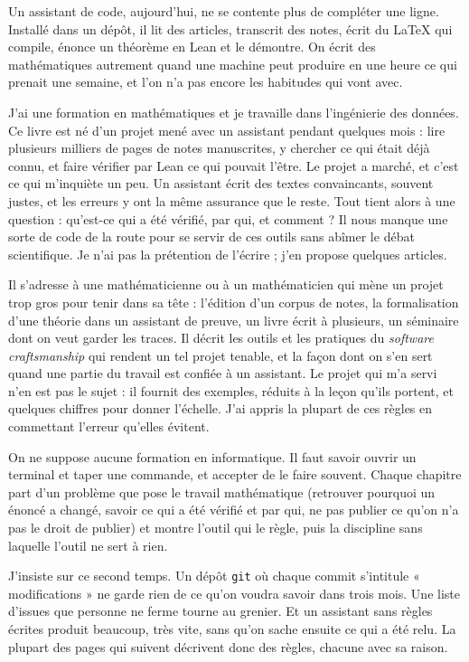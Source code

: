 Un assistant de code, aujourd'hui, ne se contente plus de compléter une ligne. Installé
dans un dépôt, il lit des articles, transcrit des notes, écrit du LaTeX qui compile, énonce
un théorème en Lean et le démontre. On écrit des mathématiques autrement quand une machine
peut produire en une heure ce qui prenait une semaine, et l'on n'a pas encore les habitudes
qui vont avec.

J'ai une formation en mathématiques et je travaille dans l'ingénierie des données.
Ce livre est né d'un projet mené avec un assistant pendant quelques mois : lire plusieurs milliers
de pages de notes manuscrites, y chercher ce qui était déjà connu, et faire vérifier par
Lean ce qui pouvait l'être. Le projet a marché, et c'est ce qui m'inquiète un peu. Un
assistant écrit des textes convaincants, souvent justes, et les erreurs y ont la même
assurance que le reste. Tout tient alors à une question : qu'est-ce qui a été vérifié, par
qui, et comment ? Il nous manque une sorte de code de la route pour se servir de ces outils
sans abîmer le débat scientifique. Je n'ai pas la prétention de l'écrire ; j'en propose
quelques articles.

Il s'adresse à une mathématicienne ou à un mathématicien qui mène un projet trop gros pour
tenir dans sa tête : l'édition d'un corpus de notes, la formalisation d'une théorie dans un
assistant de preuve, un livre écrit à plusieurs, un séminaire dont on veut garder les
traces. Il décrit les outils et les pratiques du \emph{software craftsmanship} qui rendent
un tel projet tenable, et la façon dont on s'en sert quand une partie du travail est
confiée à un assistant. Le projet qui m'a servi n'en est pas le sujet : il fournit des
exemples, réduits à la leçon qu'ils portent, et quelques chiffres pour donner l'échelle.
J'ai appris la plupart de ces règles en commettant l'erreur qu'elles évitent.

On ne suppose aucune formation en informatique. Il faut savoir ouvrir un terminal et taper
une commande, et accepter de le faire souvent. Chaque chapitre part d'un problème que pose
le travail mathématique (retrouver pourquoi un énoncé a changé, savoir ce qui a été vérifié
et par qui, ne pas publier ce qu'on n'a pas le droit de publier) et montre l'outil qui le
règle, puis la discipline sans laquelle l'outil ne sert à rien.

J'insiste sur ce second temps. Un dépôt \texttt{git} où chaque
commit s'intitule « modifications » ne garde rien de ce qu'on voudra savoir dans trois
mois. Une liste d'issues que personne ne ferme tourne au grenier. Et un assistant sans
règles écrites produit beaucoup, très vite, sans qu'on sache ensuite ce qui a été relu. La
plupart des pages qui suivent décrivent donc des règles, chacune avec sa raison.

